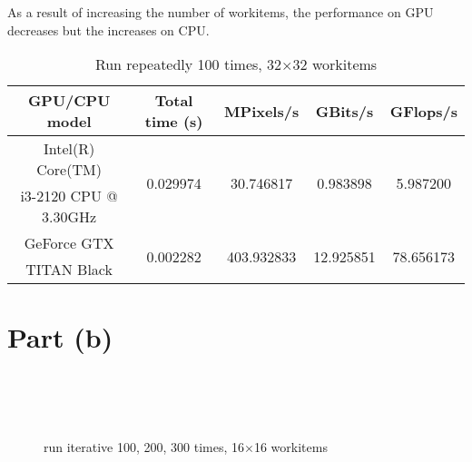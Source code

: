 \documentclass[12pt]{article}
\begin{document}
As a result of increasing the number of workitems, the performance on GPU decreases but the increases on CPU. 
\begin{table}[h]
  \centering
  \begin{tabular}{ | c | c | c | c | c |}
    \hline
    GPU/CPU model & Total time (s) & MPixels/s & GBits/s & GFlops/s \\ \hline
     Intel(R) Core(TM)  & \multirow{2}{*}{0.029974} & \multirow{2}{*}{30.746817} & \multirow{2}{*}{0.983898}  & \multirow{2}{*}{5.987200}  \\ 
     i3-2120 CPU @ 3.30GHz & & & & \\ \hline
     GeForce GTX  & \multirow{2}{*}{0.002282} & \multirow{2}{*}{403.932833} & \multirow{2}{*}{12.925851} & \multirow{2}{*}{78.656173} \\ 
     TITAN Black & & & &  \\ \hline
    \end{tabular}
    \caption{Run repeatedly 100 times, 32$\times$32 workitems}
\end{table}

\newpage

\section{Part (b)}
\begin{figure}
\centering
{} \\
\\
\\
\caption{run iterative 100, 200, 300 times, 16$\times$16 workitems}
\end{figure}
\end{document}
